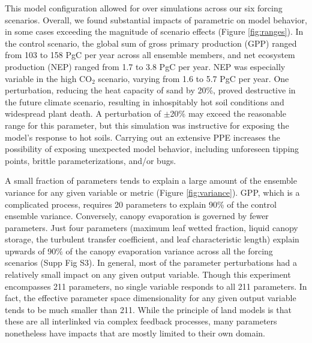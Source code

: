 \documentclass[draft]{agujournal2019}
\begin{document}
This model configuration allowed for over   simulations across our six forcing scenarios.
Overall, we found substantial impacts of parametric   on model behavior, in some cases exceeding the magnitude of scenario effects (Figure \ref{fig:ranges}). In the control scenario, the global sum of gross primary production (GPP) ranged from 103 to 158 PgC per year across all ensemble members, and net ecosystem production (NEP) ranged from 1.7 to 3.8 PgC per year. NEP was especially variable in the high CO$_2$ scenario, varying from 1.6 to 5.7 PgC per year. One perturbation, reducing the heat capacity of sand by 20\%, proved destructive in the future climate scenario, resulting in inhospitably hot soil conditions and widespread plant death. A perturbation of $\pm$20\% may exceed the reasonable range for this parameter, but this simulation was instructive for exposing the model's response to hot soils. Carrying out an extensive PPE increases the possibility of exposing unexpected model behavior, including unforeseen tipping points, brittle parameterizations, and/or bugs.

A small fraction of parameters tends to explain a large amount of the ensemble variance for any given variable or metric (Figure \ref{fig:variance}). GPP, which is a complicated process, requires 20 parameters to explain 90\% of the control ensemble variance. Conversely, canopy evaporation is governed by fewer parameters.  Just four parameters (maximum leaf wetted fraction, liquid canopy storage, the turbulent transfer coefficient, and leaf characteristic length) explain upwards of 90\% of the canopy evaporation variance across all the forcing scenarios (Supp Fig S3). In general, most of the parameter perturbations had a relatively small impact on any given output variable. Though this experiment encompasses 211 parameters, no single variable responds to all 211 parameters. In fact, the effective parameter space dimensionality for any given output variable tends to be much smaller than 211. While the principle of land models is that these are all interlinked via complex feedback processes, many parameters nonetheless have impacts that are mostly limited to their own domain. 
\end{document}
